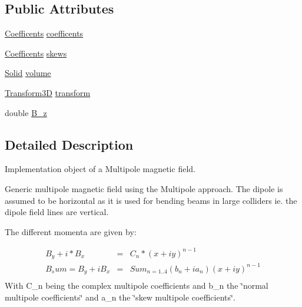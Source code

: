 \subsection*{Public Attributes}
\begin{DoxyCompactItemize}
\item 
\hyperlink{class_d_d4hep_1_1_geometry_1_1_multipole_field_a760b1b7561c93dd8438ea523cbc660bc}{Coefficents} \hyperlink{class_d_d4hep_1_1_geometry_1_1_multipole_field_a0d73fa0209b6773df83c05b53060324a}{coefficents}
\item 
\hyperlink{class_d_d4hep_1_1_geometry_1_1_multipole_field_a760b1b7561c93dd8438ea523cbc660bc}{Coefficents} \hyperlink{class_d_d4hep_1_1_geometry_1_1_multipole_field_a52a44a6298e89815f17e1c271b7644d2}{skews}
\item 
\hyperlink{namespace_d_d4hep_1_1_geometry_a83de90a8dcc7378ba47d54ef9a6a687b}{Solid} \hyperlink{class_d_d4hep_1_1_geometry_1_1_multipole_field_a6ff1c10d2c4b9a47db39b466e45de63a}{volume}
\item 
\hyperlink{namespace_d_d4hep_1_1_geometry_aeb4c0356d12fd7be49a0aae50514e64b}{Transform3D} \hyperlink{class_d_d4hep_1_1_geometry_1_1_multipole_field_aa4040740a5339e8dc1f1d7e65187ea0e}{transform}
\item 
double \hyperlink{class_d_d4hep_1_1_geometry_1_1_multipole_field_a5b182acb00dda0675a4166293230e948}{B\+\_\+z}
\end{DoxyCompactItemize}


\subsection{Detailed Description}
Implementation object of a Multipole magnetic field. 

Generic multipole magnetic field using the Multipole approach. The dipole is assumed to be horizontal as it is used for bending beams in large colliders ie. the dipole field lines are vertical.

The different momenta are given by\+:

\begin{eqnarray*} B_y + i*B_x &=& C_n * (x + iy)^{n-1} \\ B_sum = B_y + i B_x &=& Sum_{n=1..4} (b_n + ia_n) (x + iy)^{n-1} \\ \end{eqnarray*} With C\+\_\+n being the complex multipole coefficients and b\+\_\+n the \char`\"{}normal multipole coefficients\char`\"{} and a\+\_\+n the \char`\"{}skew multipole coefficients\char`\"{}.

